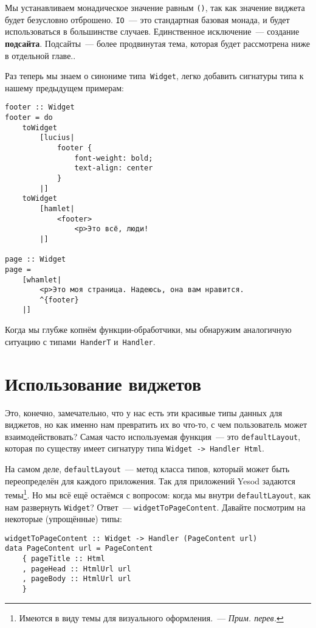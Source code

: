 Мы устанавливаем монадическое значение равным \lstinline'()', так как значение
виджета будет безусловно отброшено. \lstinline'IO'~--- это стандартная базовая
монада, и будет использоваться в большинстве случаев. Единственное
исключение~--- создание \textbf{подсайта}. Подсайты~--- более продвинутая тема,
которая будет рассмотрена ниже в отдельной главе..

Раз теперь мы знаем о синониме типа~\lstinline'Widget', легко добавить
сигнатуры типа к нашему предыдущем примерам:
\begin{lstlisting}
footer :: Widget
footer = do
    toWidget
        [lucius|
            footer {
                font-weight: bold;
                text-align: center
            }
        |]
    toWidget
        [hamlet|
            <footer>
                <p>Это всё, люди!
        |]

page :: Widget
page =
    [whamlet|
        <p>Это моя страница. Надеюсь, она вам нравится.
        ^{footer}
    |]
\end{lstlisting}

Когда мы глубже копнём функции-обработчики, мы обнаружим аналогичную
ситуацию с типами~\lstinline'HanderT' и~\lstinline'Handler'.

\section{Использование виджетов}
Это, конечно, замечательно, что у нас есть эти красивые типы данных для виджетов,
но как именно нам превратить их во что-то, с чем пользователь может
взаимодействовать? Самая часто используемая функция~--- это
\lstinline'defaultLayout', которая по существу имеет сигнатуру типа
\lstinline'Widget -> Handler Html'.

На самом деле, \lstinline'defaultLayout'~--- метод класса типов, который может
быть переопределён для каждого приложения. Так для приложений Yesod задаются
темы\footnote{Имеются в виду темы для визуального оформления.~--- \emph{Прим.
перев.}}. Но мы всё ещё остаёмся с вопросом: когда мы внутри
\lstinline'defaultLayout', как нам развернуть \lstinline'Widget'? Ответ~---
\lstinline'widgetToPageContent'. Давайте посмотрим на некоторые (упрощённые)
типы:
\begin{lstlisting}
widgetToPageContent :: Widget -> Handler (PageContent url)
data PageContent url = PageContent
    { pageTitle :: Html
    , pageHead :: HtmlUrl url
    , pageBody :: HtmlUrl url
    }
\end{lstlisting}

